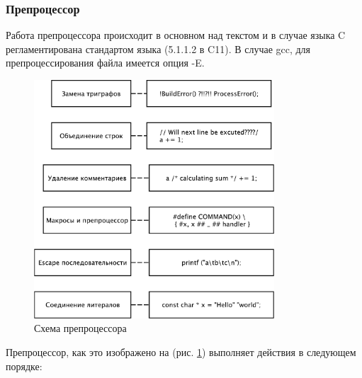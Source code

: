 \documentclass[a4paper,12pt,oneside]{article}
\begin{document}
\subsubsection{Препроцессор}\label{subsec:Preprocessor}

Работа препроцессора происходит в основном над текстом и в случае языка C регламентирована стандартом языка (5.1.1.2 в C11). В случае gcc, для препроцессирования файла имеется опция -E.

\begin{figure}[ht]
\centering
\includegraphics[width=0.8\textwidth]{illustrations/preprocessor-scheme-crop.pdf}
\caption{Схема препроцессора}
\label{fig:preproc_scheme}
\end{figure}

Препроцессор, как это изображено на (рис. \ref{fig:preproc_scheme}) выполняет действия в следующем порядке:
\end{document}

